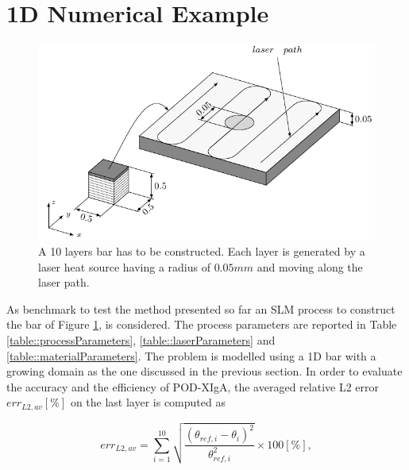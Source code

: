 \documentclass[3p]{article}
\begin{document}

\section*{1D Numerical Example}
\begin{figure}
\includegraphics[width=\linewidth]{externals/Pictures/PODXIGABenchmarkBAR.pdf}
\caption{A 10 layers bar has to be constructed. Each layer is generated by a laser heat source having a radius of $0.05mm$ and moving along the laser path.}
\label{PODXIGABenchmark}
\end{figure}
As benchmark to test the method presented so far an SLM process to construct the bar of Figure \ref{PODXIGABenchmark}, is considered. The process parameters are reported in Table \ref{table::processParameters}, \ref{table::laserParameters} and \ref{table::materialParameters}. The problem is modelled using a 1D bar with a growing domain as the one discussed in the previous section.
In order to evaluate the accuracy and the efficiency of POD-XIgA, the averaged relative L2 error $err_{L2,av}\left[\%\right]$ on the last layer is computed as

\begin{equation}
err_{L2,av} = \sum_{i=1}^{10}\sqrt{\dfrac{(\theta_{ref,i}-\theta_{i})^{2}}{\theta_{ref,i}^2}}\times 100\left[\%\right],
\end{equation}
\end{document}
